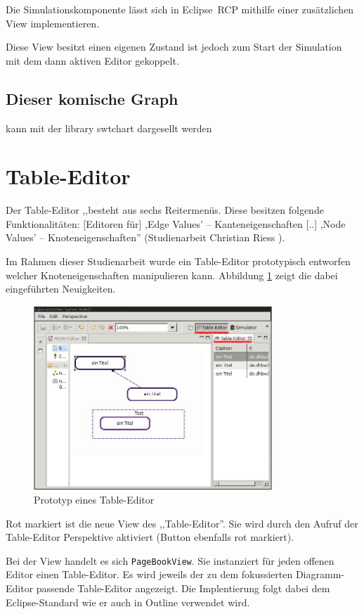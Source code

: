 \documentclass[%
12pt,titlepage,abstracton]{scrreprt}
\begin{document}
Die Simulationskomponente lässt sich in Eclipse~RCP mithilfe einer zusätzlichen
View implementieren.

Diese View besitzt einen eigenen Zustand ist jedoch zum Start der Simulation mit dem
dann aktiven Editor gekoppelt.

\subsection{Dieser komische Graph}
kann mit der library swtchart dargesellt werden

\section{Table-Editor}
Der Table-Editor ,,besteht aus sechs Reitermenüs. Diese besitzen folgende
Funktionalitäten: [Editoren für] ,Edge Values' – Kanteneigenschaften [..]
,Node Values' – Knoteneigenschaften'' (Studienarbeit Christian Riess \cite[S.
24]{riess03}).

Im Rahmen dieser Studienarbeit wurde ein Table-Editor prototypisch entworfen
welcher Knoteneigenschaften manipulieren kann. Abbildung \ref{fig:table-editor}
zeigt die dabei eingeführten Neuigkeiten.

\begin{figure}[ht!]
\centering
\includegraphics[width=0.8\textwidth]{images/table-editor.jpg}
\caption{Prototyp eines Table-Editor}
\label{fig:table-editor}
\end{figure}

Rot markiert ist die neue View des ,,Table-Editor''. Sie wird durch den Aufruf
der Table-Editor Perspektive aktiviert (Button ebenfalls rot markiert).

Bei der View handelt es sich \texttt{PageBookView}. Sie instanziert für jeden
offenen Editor einen Table-Editor. Es wird jeweils der zu dem fokussierten
Diagramm-Editor passende Table-Editor angezeigt. Die Implentierung folgt dabei
dem Eclipse-Standard wie er auch in Outline verwendet wird.
\end{document}
